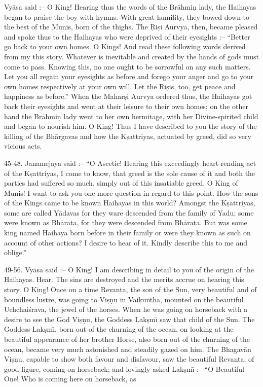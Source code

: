 Vy\=asa said :-- O King! Hearing thus the words of the Br\=ahmi\d{n} lady, the Haihayas began to praise the boy with hymns. With great humility, they bowed down to the best of the Munis, born of the thighs. The \d{R}i\d{s}i Aurvya, then, became pleased and spoke thus to the Haihayas who were deprived of their eyesights :-- ``Better go back to your own homes. O Kings! And read these following words derived from my this story. Whatever is inevitable and created by the hands of gods must come to pass. Knowing this, no one ought to be sorrowful on any such matters. Let you all regain your eyesights as before and forego your anger and go to your own homes respectively at your own will. Let the \d{R}i\d{s}is, too, get peace and happiness as before.'' When the Mahar\d{s}i Aurvya ordered thus, the Haihayas got back their eyesights and went at their leisure to their own homes; on the other hand the Br\=ahmi\d{n} lady went to her own hermitage, with her Divine-spirited child and began to nourish him. O King! Thus I have described to you the story of the killing of the Bh\=argavas and how the K\d{s}attriyas, actuated by greed, did so very vicious acts.

45-48. Janamejaya said :-- ``O Ascetic! Hearing this exceedingly heart-rending act of the K\d{s}attriyas, I come to know, that greed is the sole cause of it and both the parties had suffered so much, simply out of this insatiable greed. O King of Munis! I want to ask you one more question in regard to this point. How the sons of the Kings came to be known Haihayas in this world? Amongst the K\d{s}attriyas, some are called Y\=adavas for they ware descended from the family of Yadu; some were known as Bh\=arata, for they were descended from Bh\=arata. But was some king named Haihaya born before in their family or were they known as such on account of other actions? I desire to hear of it. Kindly describe
this to me and oblige.''

49-56. Vy\=asa said :-- O King! I am describing in detail to you of the origin of the Haihayas. Hear. The sins are destroyed and the merits accrue on hearing this story. O King! Once on a time Revanta, the son of the Sun, very beautiful and of boundless lustre, was going to Vi\d{s}\d{n}u in Vaikuntha, mounted on the beautiful Uchchai\'srava, the jewel of the horses. When he was going on horseback with a desire to see the God Vi\d{s}\d{n}u, the Goddess Lak\d{s}m\={\i} saw that child of the Sun. The Goddess Lak\d{s}m\={\i}, born out of the churning of the ocean, on looking at the beautiful appearance of her brother Horse, also born out of the churning of the ocean, became very much astonished and steadily gazed on him. The Bhagav\=an Vi\d{s}\d{n}u, capable to show both favour and disfavour, saw the beautiful Revanta, of good figure, coming on horseback; and lovingly asked Lak\d{s}m\={\i} :-- ``O Beautiful One! Who is coming here on horseback, as

